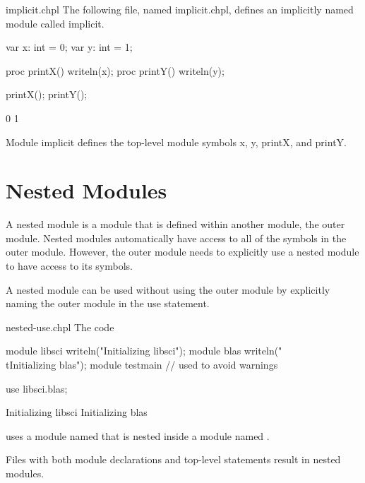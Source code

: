 \begin{chapelexample}{implicit.chpl}
The following file, named implicit.chpl, defines an implicitly named
module called implicit.
\begin{chapel}
var x: int = 0;
var y: int = 1;

proc printX() {
  writeln(x);
}
proc printY() {
  writeln(y);
}
\end{chapel}
\begin{chapelpost}
printX();
printY();
\end{chapelpost}
\begin{chapeloutput}
0
1
\end{chapeloutput}
Module implicit defines the top-level module symbols x, y, printX, and
printY.
\end{chapelexample}


\section{Nested Modules}
\label{Nested_Modules}

A nested module is a module that is defined within another module, the
outer module.  Nested modules automatically have access to all of the
symbols in the outer module.  However, the outer module needs to
explicitly use a nested module to have access to its symbols.

A nested module can be used without using the outer module by
explicitly naming the outer module in the use statement.
\begin{chapelexample}{nested-use.chpl}
The code
\begin{chapelpre}
module libsci {
  writeln("Initializing libsci");
  module blas {
    writeln("\\tInitializing blas");
  }
}
module testmain { // used to avoid warnings
}
\end{chapelpre}
\begin{chapel}
use libsci.blas;
\end{chapel}
\begin{chapeloutput}
Initializing libsci
	Initializing blas
\end{chapeloutput}
uses a module named  that is nested inside a module
named .
\end{chapelexample}

Files with both module declarations and top-level statements result in
nested modules.

